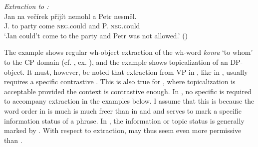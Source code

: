 \documentclass[output=paper,colorlinks,citecolor=brown,]{langsci/langscibook}
\begin{document}
\begin{exe}
\ex \label{23}\textit{Extraction to :}\smallskip\\
\gll Jan na večírek přijít  nemohl a Petr nesměl.\\
J.    to  party    come \textsc{neg}.could  and P.    \textsc{neg}.could\\
\glt `Jan could't come to the party and Petr was not allowed.' \hfill ()
\end{exe}

\noindent The example  shows regular wh-object extraction of the  wh-word \textit{komu} `to whom' to the CP domain (cf. , ex. ), and the example  shows topicalization of an  DP-object. It must, however, be noted that extraction from VP in , like in , usually requires a specific contrastive  \citep{Schuyler2001,Lasnik2001,Merchant2008b}. This is also true for , where topicalization is acceptable provided the context is contrastive enough. In , no specific  is required to accompany extraction in the examples below. I assume that this is because the word order in  is much is much freer than in  and  and serves to mark a specific information status of a phrase. In , the information  or topic status is generally marked by . With respect to extraction,  may thus seem even more permissive than .
\end{document}

